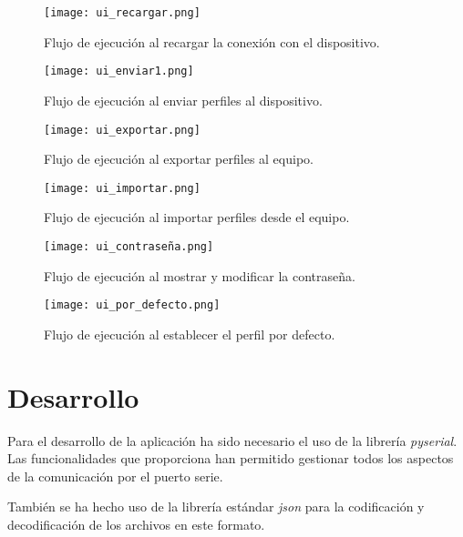 \begin{figure}[h!]
    \centering
    \texttt{[image: ui\_recargar.png]}
    \caption{Flujo de ejecución al recargar la conexión con el dispositivo.}
    \label{fig:ui_recargar}
\end{figure}

\begin{figure}[h!]
    \centering
    \texttt{[image: ui\_enviar1.png]}
    \caption{Flujo de ejecución al enviar perfiles al dispositivo.}
    \label{fig:ui_enviar1}
\end{figure}

\begin{figure}[h!]
    \centering
    \texttt{[image: ui\_exportar.png]}
    \caption{Flujo de ejecución al exportar perfiles al equipo.}
    \label{fig:ui_exportar}
\end{figure}

\begin{figure}[h!]
    \centering
    \texttt{[image: ui\_importar.png]}
    \caption{Flujo de ejecución al importar perfiles desde el equipo.}
    \label{fig:ui_importar}
\end{figure}

\begin{figure}[h!]
    \centering
    \texttt{[image: ui\_contraseña.png]}
    \caption{Flujo de ejecución al mostrar y modificar la contraseña.}
    \label{fig:ui_contraseña}
\end{figure}

\begin{figure}[h!]
    \centering
    \texttt{[image: ui\_por\_defecto.png]}
    \caption{Flujo de ejecución al establecer el perfil por defecto.}
    \label{fig:ui_por_defecto}
\end{figure}

\section{Desarrollo}

Para el desarrollo de la aplicación ha sido necesario el uso de la librería \textit{pyserial}\cite{pyserial-lib}. Las funcionalidades que proporciona han permitido gestionar todos los aspectos de la comunicación por el puerto serie.

También se ha hecho uso de la librería estándar \textit{json}\cite{json-lib} para la codificación y decodificación de los archivos en este formato.

